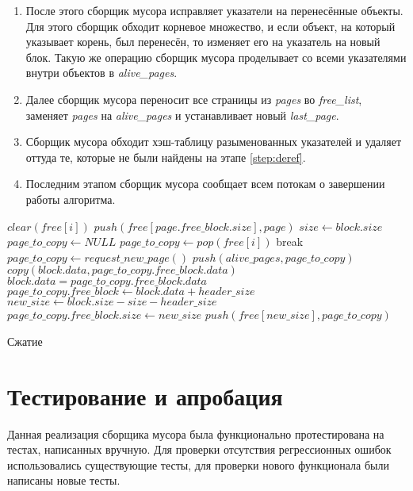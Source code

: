 \documentclass[14pt]{matmex-diploma}
\begin{document}
\begin{enumerate}
\item После этого сборщик мусора исправляет указатели на перенесённые объекты. Для этого сборщик обходит корневое множество, и если объект, на который указывает корень, был перенесён, то изменяет его на указатель на новый блок. Такую же операцию сборщик мусора проделывает со всеми указателями внутри объектов в \textit{alive\_pages}.
\item Далее сборщик мусора переносит все страницы из \textit{pages} во \textit{free\_list}, заменяет \textit{pages} на \textit{alive\_pages} и устанавливает новый \textit{last\_page}.
\item Сборщик мусора обходит хэш-таблицу разыменованных указателей и удаляет оттуда те, которые не были найдены на этапе \ref{step:deref}.
\item Последним этапом сборщик мусора сообщает всем потокам о завершении работы алгоритма. 
\end{enumerate}

\begin{algorithm}
\begin{algorithmic}[1]
    \State $clear(free[i])$
\EndFor
{}
    \State $push(free[page.free\_block.size], page)$
\EndFor
{}
            \State $size \gets block.size$
            \State $page\_to\_copy \gets NULL$
                    \State $page\_to\_copy \gets pop(free[i])$
                    \State break
                \EndIf
            \EndFor
                \State $page\_to\_copy \gets request\_new\_page()$
                \State $push(alive\_pages, page\_to\_copy)$
            \EndIf
            \State $copy(block.data, page\_to\_copy.free\_block.data)$
            \State $block.data = page\_to\_copy.free\_block.data$
            \State $page\_to\_copy.free\_block \gets block.data + header\_size$
            \State $new\_size \gets block.size - size - header\_size$
            \State $page\_to\_copy.free\_block.size \gets new\_size$
            \State $push(free[new\_size], page\_to\_copy)$
        \EndIf
    \EndFor
\EndFor

\end{algorithmic}
\caption{Сжатие}\label{alg:copy}
\end{algorithm}
\pagebreak
\section{Тестирование и апробация}
Данная реализация сборщика мусора была функционально протестирована на тестах, написанных вручную. Для проверки отсутствия регрессионных ошибок использовались существующие тесты, для проверки нового функционала были написаны новые тесты.
\end{document}
